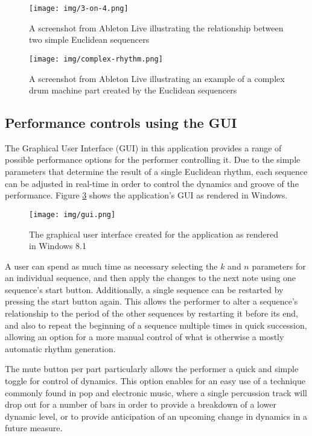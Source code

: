 \documentclass{sig-alternate-05-2015}
\begin{document}
\begin{figure}
\centering
\texttt{[image: img/3-on-4.png]}
\caption{A screenshot from Ableton Live illustrating the relationship between two simple Euclidean sequencers}
\label{3-on-4}
\end{figure}

\begin{figure}
\centering
\texttt{[image: img/complex-rhythm.png]}
\caption{A screenshot from Ableton Live illustrating an example of a complex drum machine part created by the Euclidean sequencers}
\label{complex}
\end{figure}

\subsection{Performance controls using the GUI}

The Graphical User Interface (GUI) in this application provides a range of possible performance options for the performer controlling it. Due to the simple parameters that determine the result of a single Euclidean rhythm, each sequence can be adjusted in real-time in order to control the dynamics and groove of the performance. Figure \ref{gui} shows the application's GUI as rendered in Windows.

\begin{figure}
\centering
\texttt{[image: img/gui.png]}
\caption{The graphical user interface created for the application as rendered in Windows 8.1}
\label{gui}
\end{figure}

A user can spend as much time as necessary selecting the $k$ and $n$ parameters for an individual sequence, and then apply the changes to the next note using one sequence's start button. Additionally, a single sequence can be restarted by pressing the start button again. This allows the performer to alter a sequence's relationship to the period of the other sequences by restarting it before its end, and also to repeat the beginning of a sequence multiple times in quick succession, allowing an option for a more manual control of what is otherwise a mostly automatic rhythm generation.

The mute button per part particularly allows the performer a quick and simple toggle for control of dynamics. This option enables for an easy use of a technique commonly found in pop and electronic music, where a single percussion track will drop out for a number of bars in order to provide a breakdown of a lower dynamic level, or to provide anticipation of an upcoming change in dynamics in a future measure. 
\end{document}
